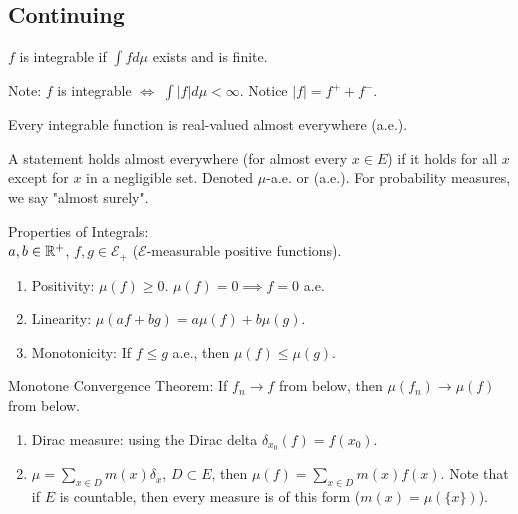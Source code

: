 \documentclass[english, course]{Notes}
\begin{document}
\subsection{Continuing}

\begin{definition}
$f$ is integrable if $\int f d\mu$ exists and is finite.\\
\end{definition}

Note: $f$ is integrable $\iff$ $\int |f| d\mu < \infty$. Notice $|f| = f^+ + f^-$.\\

\begin{exercise}
Every integrable function is real-valued almost everywhere (a.e.).\\
\end{exercise}

\begin{definition}
A statement holds almost everywhere (for almost every $x \in E$) if it holds for all $x$ except for $x$ in a negligible set. Denoted $\mu$-a.e. or (a.e.). For probability measures, we say "almost surely".
\end{definition}

Properties of Integrals:\\
$a, b \in \mathbb{R}^+$, $f, g \in \mathcal{E}_+$ ($\mathcal{E}$-measurable positive functions).

\begin{enumerate}
	\item Positivity: $\mu(f) \geq 0$. $\mu(f) = 0 \implies f = 0$ a.e.
	\item Linearity: $\mu(af + bg) = a\mu(f) + b\mu(g)$.
	\item Monotonicity: If $f \leq g$ a.e., then $\mu(f) \leq \mu(g)$.
\end{enumerate}

Monotone Convergence Theorem: If $f_n \to f$ from below, then $\mu(f_n) \to \mu(f)$ from below.\\

\begin{enumerate}
	\item Dirac measure: using the Dirac delta $\delta_{x_0} (f) = f(x_0)$.\\
	\item $\mu = \sum_{x \in D} m(x)\delta_x$, $D \subset E$, then $\mu(f) = \sum_{x \in D} m(x) f(x)$. Note that if $E$ is countable, then every measure is of this form ($m(x) = \mu(\{x\})$).
\end{enumerate}
\end{document}
